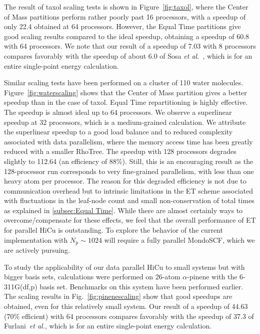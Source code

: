 \commentoutA{\documentclass[prl,aps,twocolumn,showpacs,twocolumngrid,superbib]{revtex4}}
\newcommand{\Np}{N_{\mathrm{p}}} \newcommand{\Nbox}{N_{\mathrm{b}}}
\begin{document}
The result of taxol scaling tests is shown in Figure~\ref{fig:taxol},
where the Center of Mass partitions perform rather poorly past 16 processors, with
a speedup of only 22.4 obtained at 64 processors.  However, the Equal
Time partitions give good scaling results compared to the ideal
speedup, obtaining a speedup of 60.8 with 64 processors.  We note that
our result of a speedup of 7.03 with 8 processors compares favorably
with the speedup of about 6.0 of Sosa {\it et al.}~\cite{Sosa_00v26},
which is for an entire single-point energy calculation.

Similar scaling tests have been performed on a cluster of 110 water
molecules.  Figure~\ref{fig:waterscaling} shows that the Center of
Mass partition gives a better speedup than in the case of taxol.
Equal Time repartitioning is highly effective.  The speedup
is almost ideal up to 64 processors. We observe a superlinear speedup
at 32 processors, which is a medium-grained calculation.  We attribute
the superlinear speedup to a good load balance and to reduced
complexity associated with data parallelism, where the memory access
time has been greatly reduced with a smaller RhoTree.  The speedup
with 128 processors degrades slightly to 112.64 (an efficiency of
88\%).  Still, this is an encouraging result as the 128-processor run
corresponds to very fine-grained parallelism, with less than one heavy
atom per processor. The reason for this degraded efficiency is not due
to communication overhead but to intrinsic limitations in the ET
scheme associated with fluctuations in the leaf-node count and small
non-conservation of total times as explained in
\ref{subsec:Equal Time}.  While there are almost certainly ways to
overcome/compensate for these effects, we feel that the overall
performance of ET for parallel HiCu is outstanding.  To explore
the behavior of the current implementation with $\Np \sim 1024 $ will 
require a fully parallel {\sc MondoSCF}, which we are actively pursuing.

To study the applicability of our data parallel HiCu to small systems but
with bigger basis sets, calculations were performed on 26-atom
$\alpha$-pinene with the 6-311G(df,p) basis set. Benchmarks on this system
have been performed earlier\cite{Furlani_00v128,Sosa_00v26}. 
The scaling results in Fig.~\ref{fig:pinenescaling}
show that good speedups are obtained, even for this relatively small
system. Our result of a speedup of 44.63 (70\% efficient) 
with 64 processors compares
favorably with the speedup of 37.3 of 
Furlani~{\it et al.}\cite{Furlani_00v128}, which is for an entire single-point
energy calculation.
\end{document}

